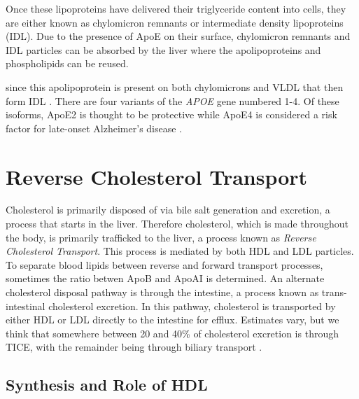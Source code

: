 \documentclass{tufte-handout}
\begin{document}
  Once these lipoproteins have delivered their triglyceride content into cells, they are either known as chylomicron remnants or intermediate density lipoproteins (IDL).  Due to the presence of ApoE on their surface, chylomicron remnants and IDL particles can be absorbed by the liver where the apolipoproteins and phospholipids can be reused.

  since this apolipoprotein is present on both chylomicrons and VLDL that then form IDL .  There are four variants of the \textit{APOE} gene numbered 1-4.  Of these isoforms, ApoE2 is thought to be protective while ApoE4 is considered a risk factor for late-onset Alzheimer's disease \citep{Poirier1993,Corder1993}.  

\section{Reverse Cholesterol Transport}

Cholesterol is primarily disposed of via bile salt generation and excretion, a process that starts in the liver.  Therefore cholesterol, which is made throughout the body, is primarily trafficked to the liver, a process known as \emph{Reverse Cholesterol Transport}.  This process is mediated by both HDL and LDL particles.  To separate blood lipids between reverse and forward transport processes, sometimes the ratio betwen ApoB and ApoAI is determined.  An alternate cholesterol disposal pathway is through the intestine, a process known as trans-intestinal cholesterol excretion.  In this pathway, cholesterol is transported by either HDL or LDL directly to the intestine for efflux.  Estimates vary, but we think that somewhere between 20 and 40\% of cholesterol excretion is through TICE, with the remainder being through biliary transport \citep{Temel2015}.

\subsection{Synthesis and Role of HDL}
\end{document}
